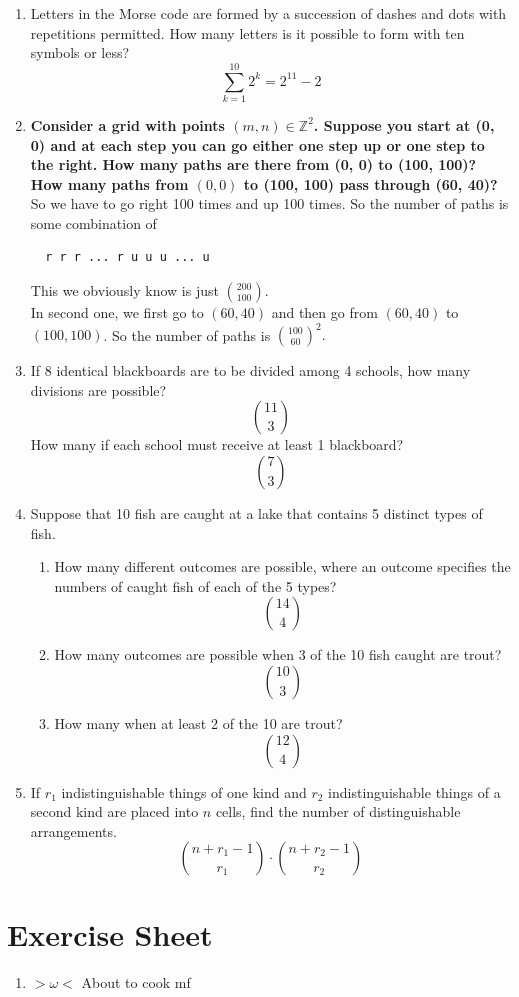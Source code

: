 \documentclass[11pt, a4paper]{article}
\begin{document}
\begin{enumerate}
\item  Letters in the Morse code are formed by a succession of dashes and dots with repetitions
permitted. How many letters is it possible to form with ten symbols or less?
 $$\sum_{k=1}^{10} 2^k=2^{11}-2$$
\item \textbf{Consider a grid with points $(m,n)\in\mathbb{Z}^2$. Suppose you  start at (0, 0) and at each step you can go either one step up or one step to the right. How many paths are there from (0, 0) to (100, 100)? How many paths from $(0, 0)$ to (100, 100) pass through (60, 40)?}\\
So we have to go right 100 times and up 100 times. So the number of paths is some combination of \begin{verbatim}
  r r r ... r u u u ... u
\end{verbatim}
This we obviously know is just $\binom{200}{100}.$\\
In second one, we first go to $(60,40)$ and then go from $(60,40)$ to $(100,100)$. So the number of paths is $\binom{100}{60}^2.$
\item If 8 identical blackboards are to be divided among 4 schools, how many divisions are possible?
$$\boxed{\binom{11}{3}}$$
How many if each school must receive at least 1 blackboard?
$$\boxed{\binom{7}{3}}$$
\item Suppose that 10 fish are caught at a lake that contains 5 distinct types of fish.
\begin{enumerate}
  \item How many different outcomes are possible, where an outcome specifies the numbers of
caught fish of each of the 5 types?
$$\boxed{\binom{14}{4}}$$
\item How many outcomes are possible when 3 of the 10 fish caught are trout?
$$\boxed{\binom{10}{3}}$$
\item How many when at least 2 of the 10 are trout?
$$\boxed{\binom{12}{4}}$$
\end{enumerate}
\item If $r_1$ indistinguishable things of one kind and $r_2$ indistinguishable things of a second kind are placed into $n$ cells, find the number of distinguishable arrangements.
$$\boxed{\binom{n+r_1-1}{r_1}\cdot\binom{n+r_2-1}{r_2}}$$
\end{enumerate}
\section{Exercise Sheet}
\begin{enumerate}
  \item $>\omega<$ About to cook mf
\end{enumerate}
\end{document}

